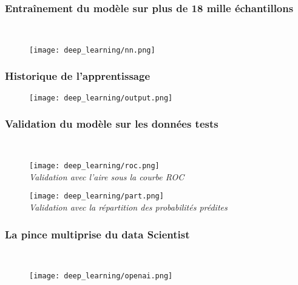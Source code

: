 \documentclass{beamer}
\theoremstyle{definition}
\begin{document}
\begin{frame}
	\frametitle{Entraînement du modèle sur plus de 18 mille échantillons}
	\hfill\\[-1cm]

		\centering
		\begin{figure}
			\centering
			\texttt{[image: deep\_learning/nn.png]}
		\end{figure}

\end{frame}

\begin{frame}
	\frametitle{Historique de l'apprentissage}
	\begin{figure}
		\centering
		\texttt{[image: deep\_learning/output.png]}
	\end{figure}
	
\end{frame}

\begin{frame}	
	\frametitle{Validation du modèle sur les données tests}
	\hfill\\[-1cm]
	\begin{minipage}[t]{1\linewidth}
		\centering
		
		\begin{minipage}[t]{0.48\linewidth}
			\raggedright
			\begin{figure}
				\centering
				\texttt{[image: deep\_learning/roc.png]}\\[0.45cm]
				\emph{Validation avec l'aire sous la courbe ROC}
			\end{figure}			
		\end{minipage}
		\hfil\begin{minipage}[t]{0.48\linewidth}
			\raggedright
			\begin{figure}
				\centering
				\texttt{[image: deep\_learning/part.png]}\\[0.68cm]
				\emph{Validation avec la répartition des probabilités prédites }
			\end{figure}
			
		\end{minipage}
	\end{minipage}
\end{frame}


\begin{frame}
	\frametitle{La pince multiprise du data Scientist}
	\hfill\\[-1cm]
	\begin{minipage}[t]{1\linewidth}
		\centering
		\begin{figure}
			\centering
			\texttt{[image: deep\_learning/openai.png]}
			
		\end{figure}
	\end{minipage}	
\end{frame}
\end{document}
